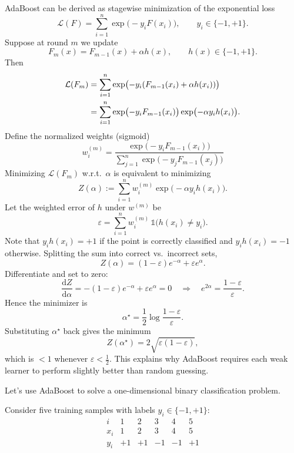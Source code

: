 \documentclass[../main]{subfiles}
\begin{document}
AdaBoost can be derived as stagewise minimization of the exponential loss
\[
    \mathcal L(F)=\sum_{i=1}^n \exp\bigl(-y_i F(x_i)\bigr),
    \qquad y_i\in\{-1,+1\}.
\]
Suppose at round $m$ we update
\[
    F_m(x)=F_{m-1}(x)+\alpha h(x),
    \qquad h(x)\in\{-1,+1\}.
\]
Then
\begin{align}
    \mathcal L(F_m)
    &=\sum_{i=1}^n \exp\bigl(-y_i(F_{m-1}(x_i)+\alpha h(x_i))\bigr)\notag\\
    &=\sum_{i=1}^n \exp\bigl(-y_iF_{m-1}(x_i)\bigr)\exp\bigl(-\alpha y_i h(x_i)\bigr).
\end{align}
Define the normalized weights (sigmoid)
\[
    w_i^{(m)}=\frac{\exp\bigl(-y_iF_{m-1}(x_i)\bigr)}{\sum_{j=1}^n \exp\bigl(-y_jF_{m-1}(x_j)\bigr)}
\]
Minimizing $\mathcal L(F_m)$ w.r.t.\ $\alpha$ is equivalent to minimizing
\[
    Z(\alpha):=\sum_{i=1}^n w_i^{(m)}\exp\bigl(-\alpha y_i h(x_i)\bigr).
\]
Let the weighted error of $h$ under $w^{(m)}$ be
\[
    \varepsilon=\sum_{i=1}^n w_i^{(m)}\,\mathbb 1\bigl(h(x_i)\neq y_i\bigr).
\]
Note that $y_i h(x_i)=+1$ if the point is correctly classified and
$y_i h(x_i)=-1$ otherwise. Splitting the sum into correct vs.\ incorrect sets,
\[
    Z(\alpha)=(1-\varepsilon)e^{-\alpha}+\varepsilon e^{\alpha}.
\]
Differentiate and set to zero:
\[
    \frac{\mathrm d Z}{\mathrm d\alpha}=-(1-\varepsilon)e^{-\alpha}+\varepsilon e^{\alpha}=0
    \quad\Longrightarrow\quad
    e^{2\alpha}=\frac{1-\varepsilon}{\varepsilon}.
\]
Hence the minimizer is
\[
    \alpha^\star=\frac12\log\frac{1-\varepsilon}{\varepsilon}.
\]
Substituting $\alpha^\star$ back gives the minimum
\[
    Z(\alpha^\star)=2\sqrt{\varepsilon(1-\varepsilon)},
\]
which is $<1$ whenever $\varepsilon<\frac12$. This explains why AdaBoost
requires each weak learner to perform slightly better than random guessing.
\begin{example}[AdaBoost]
 Let's use AdaBoost to solve a one-dimensional binary classification problem.
    
    Consider five training samples with labels $y_i\in\{-1,+1\}$:
    \[
    \begin{array}{c|ccccc}
    i & 1 & 2 & 3 & 4 & 5\\ \hline
    x_i & 1 & 2 & 3 & 4 & 5\\
    y_i & +1 & +1 & -1 & -1 & +1
    \end{array}
    \]
\end{example}
\end{document}
